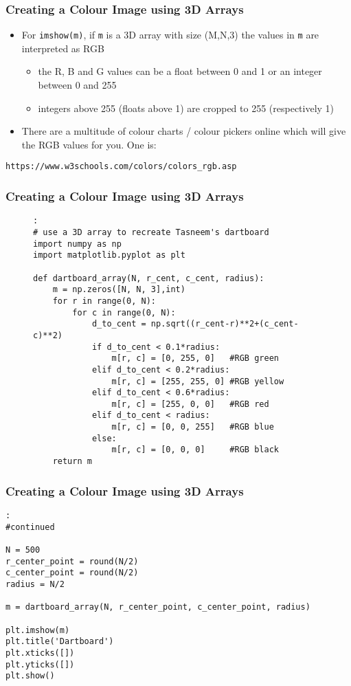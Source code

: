 \documentclass[english,14pt]{beamer}
\begin{document}
\begin{frame}[fragile]
\frametitle{Creating a Colour Image using 3D Arrays}
	\begin{itemize}
	
     	\item For \texttt{imshow(m)}, if \texttt{m} is a 3D array with size (M,N,3) the values in \texttt{m} are interpreted as RGB 
     		\begin{itemize}
     		    \item the R, B and G values can be a float between 0 and 1 or an integer between 0 and 255
     		    \item integers above 255 (floats above 1) are cropped to 255 (respectively 1)
			\end{itemize}
		 \item There are a multitude of colour charts / colour pickers online which will give the RGB values for you. One is: \\
    \end{itemize}
    
\small \texttt{https://www.w3schools.com/colors/colors\_rgb.asp}
\end{frame}

\begin{frame}[fragile]
\frametitle{Creating a Colour Image using 3D Arrays}
\begin{figure}
\begin{lstlisting}[style=PStyle]:
# use a 3D array to recreate Tasneem's dartboard
import numpy as np
import matplotlib.pyplot as plt

def dartboard_array(N, r_cent, c_cent, radius):
    m = np.zeros([N, N, 3],int)
    for r in range(0, N):
        for c in range(0, N):
            d_to_cent = np.sqrt((r_cent-r)**2+(c_cent-c)**2)
            if d_to_cent < 0.1*radius:
                m[r, c] = [0, 255, 0]   #RGB green
            elif d_to_cent < 0.2*radius:
                m[r, c] = [255, 255, 0] #RGB yellow
            elif d_to_cent < 0.6*radius:
                m[r, c] = [255, 0, 0]   #RGB red
            elif d_to_cent < radius:
                m[r, c] = [0, 0, 255]   #RGB blue
            else:
                m[r, c] = [0, 0, 0]     #RGB black
    return m
\end{lstlisting}
\end{figure}
\end{frame}

\begin{frame}[fragile]
\frametitle{Creating a Colour Image using 3D Arrays}
\begin{lstlisting}[style=PStyle]:
#continued 

N = 500
r_center_point = round(N/2)
c_center_point = round(N/2)
radius = N/2

m = dartboard_array(N, r_center_point, c_center_point, radius)

plt.imshow(m)
plt.title('Dartboard')
plt.xticks([])
plt.yticks([])
plt.show()
\end{lstlisting}
\end{frame}
\end{document}
